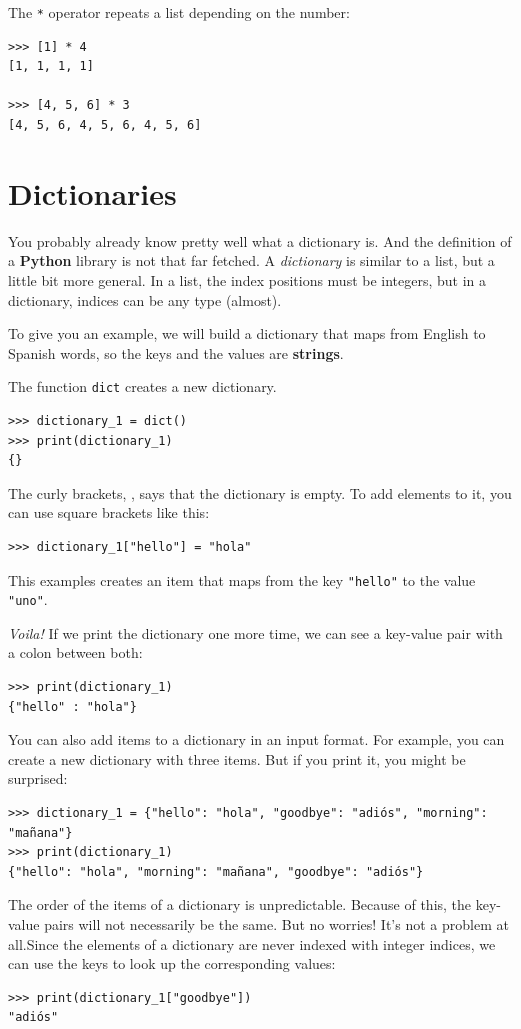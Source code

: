 The \texttt{*} operator repeats a list depending on the number:
\begin{verbatim}
>>> [1] * 4
[1, 1, 1, 1]

>>> [4, 5, 6] * 3
[4, 5, 6, 4, 5, 6, 4, 5, 6]
\end{verbatim}

\section{Dictionaries}
You probably already know pretty well what a dictionary is. And the definition of a \textbf{Python} library is not that far fetched. A \textit{dictionary} is similar to a list, but a little bit more general. In a list, the index positions must be integers, but in a dictionary, indices can be any type (almost).

To give you an example, we will build a dictionary that maps from English to Spanish words, so the keys and the values are \textbf{strings}.

The function \texttt{dict} creates a new dictionary. 
\begin{verbatim}
>>> dictionary_1 = dict()
>>> print(dictionary_1)
{}
\end{verbatim}

The curly brackets, \texttt{{}}, says that the dictionary is empty. To add elements to it, you can use square brackets like this:
\begin{verbatim}
>>> dictionary_1["hello"] = "hola"
\end{verbatim}
This examples creates an item that maps from the key \texttt{"hello"} to the value \texttt{"uno"}.

\textit{Voila!} If we print the dictionary one more time, we can see a key-value pair with a colon between both:
\begin{verbatim}
>>> print(dictionary_1)
{"hello" : "hola"}
\end{verbatim}

You can also add items to a dictionary in an input format. For example, you can create a new dictionary with three items. But if you print it, you might be surprised:
\begin{verbatim}
>>> dictionary_1 = {"hello": "hola", "goodbye": "adiós", "morning": "mañana"}
>>> print(dictionary_1)
{"hello": "hola", "morning": "mañana", "goodbye": "adiós"}
\end{verbatim}

The order of the items of a dictionary is unpredictable. Because of this, the key-value pairs will not necessarily be the same. But no worries! It's not a problem at all.Since the elements of a dictionary are never indexed with integer indices, we can use the keys to look up the corresponding values:
\begin{verbatim}
>>> print(dictionary_1["goodbye"])
"adiós"
\end{verbatim}

